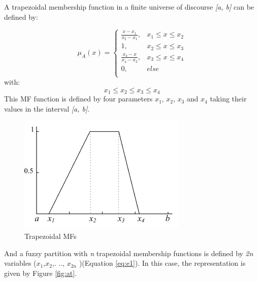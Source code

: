 \documentclass[10pt,journal,compsoc]{IEEEtran}
\begin{document}
A trapezoidal membership function in a finite universe of discourse \textit{[a, b]} can be defined by:

\begin{equation}
	\mu_{A}(x)= \left \{
	\begin{array}{ll}
		\frac{x - x_{1}}{x_{2} - x_{1}},& x_{1} \leq x \leq x_{2}\\
		1 , &x_{2} \leq x \leq x_{3}\\
		\frac{x_{4} - x}{x_{4} - x_{3}},& x_{3} \leq x \leq x_{4}\\
		0        ,& else\\	
	\end{array}
	\right.
	\label{eq:trapmf}
\end{equation}
with:
\begin{equation}
	x_{1} \leq x_{2} \leq x_{3} \leq x_{4}
\end{equation}
This MF function is defined by four parameters $x_{1}$, $x_{2}$,
$x_{3}$ and $x_{4}$ taking their values in the interval \textit{[a,
	b]}.%

\begin{figure}[!ht] 
	\begin{center}
		\includegraphics[scale=0.5]{fig/trapese}
		\caption {Trapezoidal MFs}
		\label{fig:trapeze}
	\end{center}
\end{figure}
And a fuzzy partition with \textit{n} trapezoidal membership functions
is defined by \textit{2n} variables ($x_{1}$,$x_{2}
$,. .., $x_{2n} $ )(Equation \ref{eq:e1}). In this case,
the representation is given by Figure \ref{fig:at}.
\end{document}
